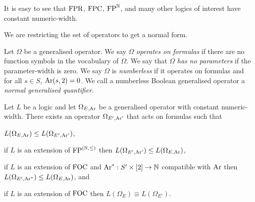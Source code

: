 \documentclass[../main/thesis.tex]{subfiles}
\begin{document}
It is easy to see that $\text{\upshape FPR}$, $\text{\upshape FPC}$, $\text{\upshape FP}^{\mathbb{N}}$, and many other logics of
interest have constant numeric-width.

We are restricting the set of operators to get a normal form.

\begin{definition}
  Let $\Omega$ be a generalised operator. We say $\Omega$ \emph{operates on
    formulas} if there are no function symbols in the vocabulary of $\Omega$. We
  say that $\Omega$ \emph{has no parameters} if the parameter-width is zero. We
  say $\Omega$ is \emph{numberless} if it operates on formulas and for all $s
  \in S$, $\text{\upshape Ar}(s, 2) = 0$. We call a numberless Boolean generalised operator a
  \emph{normal generalised quantifier}.
\end{definition}

\begin{lem}
  Let $L$ be a logic and let $\Omega_{E, \text{\upshape Ar}}$ be a generalised operator with
  constant numeric-width. There exists an operator $\Omega_{E', \text{\upshape Ar}'}$ that acts
  on formulas such that
  \begin{myenum}
  \item $L(\Omega_{E, \text{\upshape Ar}}) \leq L(\Omega_{E', \text{\upshape Ar}'})$,
  \item if $L$ is an extension of $\text{\upshape FP}^{(\mathbb{N}, \leq)}$ then $L(\Omega_{E',
      \text{\upshape Ar}'}) \leq L(\Omega_{E, \text{\upshape Ar}})$,
  \item if $L$ is an extension of $\text{\upshape FOC}$ and $\text{\upshape Ar}^* : S' \times [2] \rightarrow \mathbb{N}$
    compatible with $\text{\upshape Ar}$ then $L(\Omega_{E', \text{\upshape Ar}^*}) \leq L(\Omega_{E, \text{\upshape Ar}})$,
    and
  \item if $L$ is an extension of $\text{\upshape FOC}$ then $L(\Omega_{E}) \equiv
    L(\Omega_{E'})$.
  \end{myenum}
  \label{lem:op-to-op-on-formulas}
\end{lem}
\end{document}
